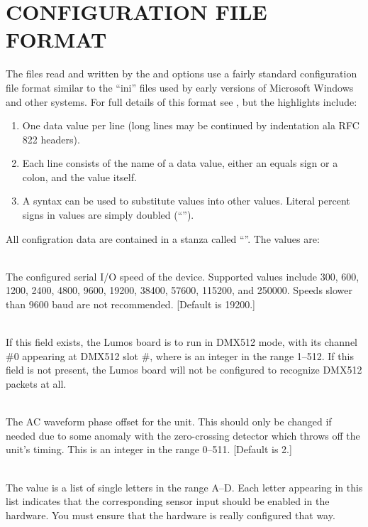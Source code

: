 \section*{CONFIGURATION FILE FORMAT}


The files read and written by the 
and
options use a fairly standard configuration file format similar to the
``ini'' files used by early versions of Microsoft Windows and other 
systems.  For full details of this format see
,
but the highlights include:
\begin{enumerate}
\item
One data value per line (long lines may be continued by indentation ala RFC 822 headers).
\item
Each line consists of the name of a data value, either an equals sign or a colon,
and the value itself.
\item
A syntax 
\codetype{\%(}
can be used to substitute values into other values.  Literal percent signs in values
are simply doubled 
(``\codetype{\%\%}'').
\end{enumerate}


All configration data are contained in a stanza called
``''.
The values are:
\begin{list}{}{}
\item[{\codetype{baud=}\Var*{n}}]\hfill\\
The configured serial I/O speed of the device.  Supported values include 300, 600, 1200, 2400,
4800, 9600, 19200, 38400, 57600, 115200, and 250000.  Speeds slower than 9600 baud
are not recommended. [Default is 19200.]
\item[{\codetype{dmxchannel=}\Var*{n}}]\hfill\\
If this field exists, the Lumos board is to run in DMX512 mode, with its channel \#0 appearing
at DMX512 slot 
\#,
where
is an integer in the range 1--512.
If this field is not present, the Lumos board will not be configured to recognize DMX512 packets
at all.
\item[{\codetype{phase=}\Var*{offset}}]\hfill\\
The AC waveform phase offset for the unit.  This should only be changed if needed due to some
anomaly with the zero-crossing detector which throws off the unit's timing.  This is an integer
in the range 0--511.  [Default is 2.]
\item[{\codetype{sensors=}\Var*{list}}]\hfill\\
The value is a list of single letters in the range A--D.  Each letter appearing in this
list indicates that the corresponding sensor input should be enabled in the hardware.
You must ensure that the hardware is really configured that way.  
\end{list}

